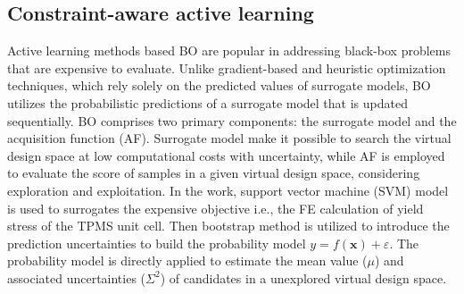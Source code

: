 \documentclass[preprint,review,12pt,authoryear]{elsarticle}
\begin{document}
\subsection{Constraint-aware active learning}
\label{sec:2-4}
Active learning methods based BO are popular in addressing black-box problems that are expensive to evaluate. Unlike gradient-based and heuristic optimization techniques, which rely solely on the predicted values of surrogate models, BO utilizes the probabilistic predictions of a surrogate model that is updated sequentially. BO comprises two primary components: the surrogate model and the acquisition function (AF). Surrogate model make it possible to search the virtual design space at low computational costs with uncertainty, while AF is employed to evaluate the score of samples in a given virtual design space, considering exploration and exploitation. In the work, support vector machine (SVM) model is used to surrogates the expensive objective i.e., the FE calculation of yield stress of the TPMS unit cell. Then bootstrap method is utilized to introduce the prediction uncertainties to build the probability model $y=f(\boldsymbol{x})+\varepsilon$. The probability model is directly applied to estimate the mean value ($\mu$) and associated uncertainties ($\Sigma^2$) of candidates in a unexplored virtual design space.
\end{document}
